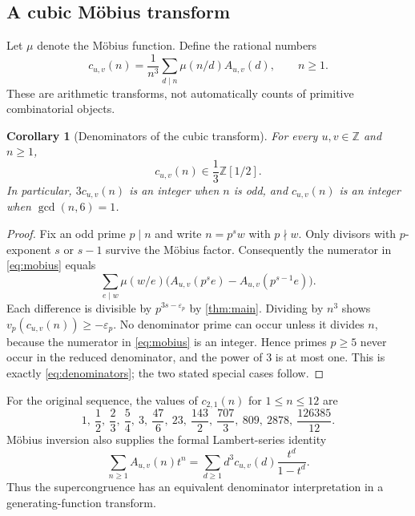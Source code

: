 \documentclass[11pt,a4paper]{article}
\numberwithin{equation}{section}
\newtheorem{corollary}[corollary]{Corollary}
\theoremstyle{definition}
\theoremstyle{remark}
\newcommand{\Z}{\mathbb Z}
\newcommand{\vp}{v_p}
\newcommand{\epsp}{\varepsilon_p}
\newcommand{\Auv}{A_{u,v}}
\begin{document}
\subsection{A cubic M\"obius transform}

Let $\mu$ denote the M\"obius function. Define the rational numbers
\begin{equation}\label{eq:mobius}
 c_{u,v}(n)=\frac1{n^3}\sum_{d\mid n}\mu(n/d)\Auv(d),\qquad n\geq1.
\end{equation}
These are arithmetic transforms, not automatically counts of primitive
combinatorial objects.

\begin{corollary}[Denominators of the cubic transform]\label{cor:mobius}
For every $u,v\in\Z$ and $n\geq1$,
\begin{equation}\label{eq:denominators}
 c_{u,v}(n)\in\frac13\Z[1/2].
\end{equation}
In particular, $3c_{u,v}(n)$ is an integer when $n$ is odd, and
$c_{u,v}(n)$ is an integer when $\gcd(n,6)=1$.
\end{corollary}
\begin{proof}
Fix an odd prime $p\mid n$ and write $n=p^s w$ with $p\nmid w$.
Only divisors with $p$-exponent $s$ or $s-1$ survive the M\"obius factor.
Consequently the numerator in \eqref{eq:mobius} equals
\begin{equation}\label{eq:mobius-pairing}
 \sum_{e\mid w}\mu(w/e)
 \bigl(\Auv(p^s e)-\Auv(p^{s-1}e)\bigr).
\end{equation}
Each difference is divisible by $p^{3s-\epsp}$ by
\cref{thm:main}. Dividing by $n^3$ shows
$\vp(c_{u,v}(n))\geq-\epsp$. No denominator prime can occur unless it
divides $n$, because the numerator in \eqref{eq:mobius} is an integer.
Hence primes $p\geq5$ never occur in the reduced denominator, and the
power of $3$ is at most one. This is exactly \eqref{eq:denominators};
the two stated special cases follow.
\end{proof}

For the original sequence, the values of $c_{2,1}(n)$ for $1\leq n\leq12$
are
\[
 1,\ \frac12,\ \frac23,\ \frac54,\ 3,\ \frac{47}{6},\ 23,
 \ \frac{143}{2},\ \frac{707}{3},\ 809,\ 2878,\ \frac{126385}{12}.
\]
M\"obius inversion also supplies the formal Lambert-series identity
\begin{equation}\label{eq:lambert}
 \sum_{n\geq1}\Auv(n)t^n
  =\sum_{d\geq1}d^3c_{u,v}(d)\frac{t^d}{1-t^d}.
\end{equation}
Thus the supercongruence has an equivalent denominator interpretation
in a generating-function transform.
\end{document}
